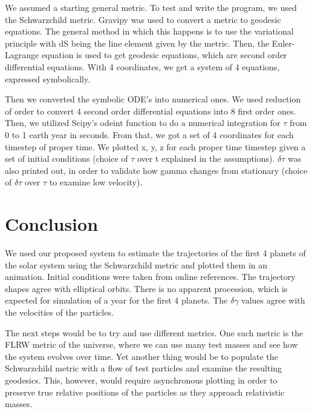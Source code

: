 \documentclass[12pt]{article}
\begin{document}
We assumed a starting general metric. To test and write the program, we used the Schwarzchild metric. Gravipy was used to convert a metric to geodesic equations. The general method in which this happens is to use the variational principle with dS being the line element given by the metric. Then, the Euler-Lagrange equation is used to get geodesic equations, which are second order differential equations. With 4 coordinates, we get a system of 4 equations, expressed symbolically.

Then we converted the symbolic ODE's into numerical ones. We used reduction of order to convert 4 second order differential equations into 8 first order ones. Then, we utilized Scipy's odeint function to do a numerical integration for $\tau$ from 0 to 1 earth year in seconds. From that, we got a set of 4 coordinates for each timestep of proper time. We plotted x, y, z for each proper time timestep given a set of initial conditions (choice of $\tau$ over t explained in the assumptions). $\delta \tau$ was also printed out, in order to validate how gamma changes from stationary (choice of $\delta \tau$ over $\tau$ to examine low velocity).

\section*{Conclusion}
We used our proposed system to estimate the trajectories of the first 4 planets of the solar system using the Schwarzchild metric and plotted them in an animation. Initial conditions were taken from online references. The trajectory shapes agree with elliptical orbits. There is no apparent procession, which is expected for simulation of a year for the first 4 planets. The $\delta \gamma$ values agree with the velocities of the particles.

The next steps would be to try and use different metrics. One such metric is the FLRW metric of the universe, where we can use many test masses and see how the system evolves over time. Yet another thing would be to populate the Schwarzchild metric with a flow of test particles and examine the resulting geodesics. This, however, would require asynchronous plotting in order to preserve true relative positions of the particles as they approach relativistic masses.
\end{document}
